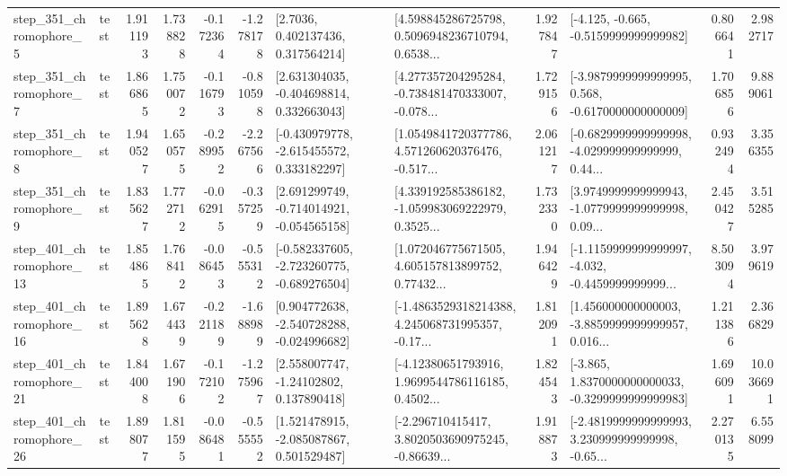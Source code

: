\begin{tabular}{llrrrrllrlrr}
   step\_351\_chromophore\_5 &      test &      1.911193 &    1.738828 &     -0.172364 & -1.278178 &          [2.7036, 0.402137436, 0.317564214] &  [4.598845286725798, 0.5096948236710794, 0.6538... &       1.927847 &              [-4.125, -0.665, -0.5159999999999982] &            0.806641 &          2.982717 \\
   step\_351\_chromophore\_7 &      test &      1.866865 &    1.750072 &     -0.116793 & -0.810598 &    [2.631304035, -0.404698814, 0.332663043] &  [4.277357204295284, -0.738481470333007, -0.078... &       1.729156 &  [-3.9879999999999995, 0.568, -0.6170000000000009] &            1.706856 &          9.889061 \\
   step\_351\_chromophore\_8 &      test &      1.940527 &    1.650575 &     -0.289952 & -2.267566 &   [-0.430979778, -2.615455572, 0.333182297] &  [1.0549841720377786, 4.571260620376476, -0.517... &       2.061217 &  [-0.6829999999999998, -4.029999999999999, 0.44... &            0.932494 &          3.356355 \\
   step\_351\_chromophore\_9 &      test &      1.835627 &    1.772712 &     -0.062915 & -0.357259 &   [2.691299749, -0.714014921, -0.054565158] &  [4.339192585386182, -1.059983069222979, 0.3525... &       1.732330 &  [3.9749999999999943, -1.0779999999999998, 0.09... &            2.450427 &          3.515285 \\
  step\_401\_chromophore\_13 &      test &      1.854865 &    1.768412 &     -0.086453 & -0.555312 &  [-0.582337605, -2.723260775, -0.689276504] &  [1.072046775671505, 4.605157813899752, 0.77432... &       1.946429 &  [-1.1159999999999997, -4.032, -0.4459999999999... &            8.503094 &          3.979619 \\
  step\_401\_chromophore\_16 &      test &      1.895628 &    1.674439 &     -0.221189 & -1.688989 &   [0.904772638, -2.540728288, -0.024996682] &  [-1.4863529318214388, 4.245068731995357, -0.17... &       1.812091 &  [1.456000000000003, -3.8859999999999957, 0.016... &            1.211386 &          2.366829 \\
  step\_401\_chromophore\_21 &      test &      1.844008 &    1.671906 &     -0.172102 & -1.275967 &     [2.558007747, -1.24102802, 0.137890418] &  [-4.12380651793916, 1.9699544786116185, 0.4502... &       1.824543 &  [-3.865, 1.8370000000000033, -0.3299999999999983] &            1.696091 &         10.036691 \\
  step\_401\_chromophore\_26 &      test &      1.898077 &    1.811595 &     -0.086481 & -0.555552 &    [1.521478915, -2.085087867, 0.501529487] &  [-2.296710415417, 3.8020503690975245, -0.86639... &       1.918873 &  [-2.4819999999999993, 3.230999999999998, -0.65... &            2.270135 &          6.558099 \\

\end{tabular}

